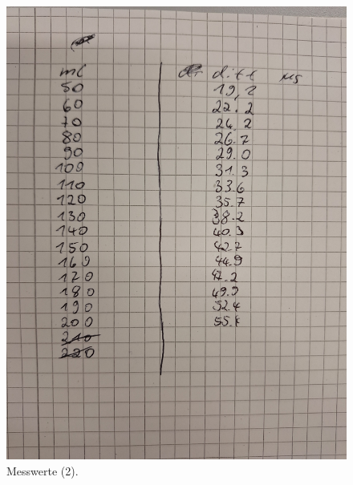 \begin{figure}[H]
    \centering
        \centering
        \includegraphics[width=\textwidth, angle=-90]{bilder/mw2.jpg}
        \caption{Messwerte (2).}
    \hfill
\end{figure}